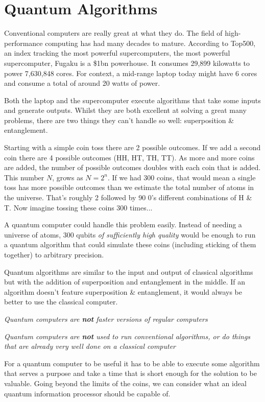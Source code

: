 \documentclass{book}
\begin{document}
\section{Quantum Algorithms} 

 Conventional computers are really great at what they do. The field of high-performance computing has had many decades to mature. According to Top500, an index tracking the most powerful supercomputers, the most powerful supercomputer, Fugaku is a \$1bn powerhouse. It consumes 29,899 kilowatts to power 7,630,848 cores. For context, a mid-range laptop today might have 6 cores and consume a total of around 20 watts of power. 

 Both the laptop and the supercomputer execute algorithms that take some inputs and generate outputs. Whilst they are both excellent at solving a great many problems, there are two things they can't handle so well: superposition \& entanglement. 

 Starting with a simple coin toss there are 2 possible outcomes. If we add a second coin there are 4 possible outcomes (HH, HT, TH, TT). As more and more coins are added, the number of possible outcomes doubles with each coin that is added. This number $N$, grows as $N = 2^n$. If we had 300 coins, that would mean a single toss has more possible outcomes than we estimate the total number of atoms in the universe. That's roughly 2 followed by 90 0's different combinations of H \& T. Now imagine tossing these coins 300 times...

 A quantum computer could handle this problem easily. Instead of needing a universe of atoms, 300 qubits \textit{of sufficiently high quality} would be enough to run a quantum algorithm that could simulate these coins (including sticking of them together) to arbitrary precision. 

 Quantum algorithms are similar to the input and output of classical algorithms but with the addition of superposition and entanglement in the middle.  If an algorithm doesn't feature superposition \& entanglement, it would always be better to use the classical computer. 


\emph{Quantum computers are \textbf{not} faster versions of regular computers}

\emph{ Quantum computers are \textbf{not} used to run conventional algorithms, or do things that are already very well done on a classical computer }

For a quantum computer to be useful it has to be able to execute some algorithm that serves a purpose and take a time that is short enough for the solution to be valuable. Going beyond the limits of the coins, we can consider what an ideal quantum information processor should be capable of. 
\end{document}

